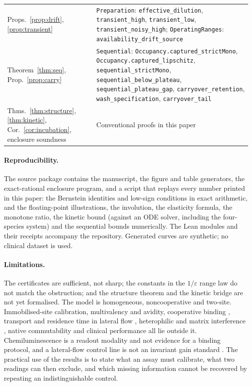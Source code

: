 \documentclass[11pt]{article}
\theoremstyle{plain}
\theoremstyle{definition}
\numberwithin{equation}{section}
\newcommand{\eps}{\varepsilon}
\begin{document}
\begin{table}[t]
\begin{tabular}{@{}>{\raggedright\arraybackslash}p{.33\linewidth}>{\raggedright\arraybackslash}p{.62\linewidth}@{}}
Props.~\ref{prop:drift}, \ref{prop:transient} & \texttt{Preparation}: \texttt{effective\_dilution}, \texttt{transient\_high}, \texttt{transient\_low}, \texttt{transient\_noisy\_high}; \texttt{OperatingRanges}: \texttt{availability\_drift\_source}\\
Theorem~\ref{thm:seq}, Prop.~\ref{prop:carry} & \texttt{Sequential}: \texttt{Occupancy.captured\_strictMono}, \texttt{Occupancy.captured\_lipschitz}, \texttt{sequential\_strictMono}, \texttt{sequential\_below\_plateau}, \texttt{sequential\_plateau\_gap}, \texttt{carryover\_retention}, \texttt{wash\_specification}, \texttt{carryover\_tail}\\
Thms.~\ref{thm:structure}, \ref{thm:kinetic}, Cor.~\ref{cor:incubation}, enclosure soundness & Conventional proofs in this paper\\\bottomrule
\end{tabular}
\end{table}

\paragraph{Reproducibility.} The source package contains the manuscript, the figure
and table generators, the exact-rational enclosure program, and a script that
replays every number printed in this paper: the Bernstein identities and low-sign
conditions in exact arithmetic, and the floating-point illustrations, the
involution, the elasticity formula, the monotone ratio, the kinetic bound (against
an ODE solver, including the four-species system) and the sequential bounds
numerically. The Lean modules and their receipts accompany the repository.
Generated curves are synthetic; no clinical dataset is used.

\paragraph{Limitations.} The certificates are sufficient, not sharp; the constants
in the $1/\eps$ range law do not match the obstruction; and the structure theorem
and the kinetic bridge are not yet formalised. The model is homogeneous,
noncooperative and two-site. Immobilised-site calibration, multivalency and avidity,
cooperative binding \cite{roy2017}, transport and residence time in lateral flow
\cite{qian2003,ross2020}, heterophilic and matrix interference
\cite{selby1999,tate2004,sturgeon2011}, native commutability and clinical
performance all lie outside it. Chemiluminescence is a readout modality and not
evidence for a binding protocol, and a lateral-flow control line is not an invariant
gain standard \cite{ross2020}. The practical use of the results is to state what an
assay must calibrate, what two readings can then exclude, and which missing
information cannot be recovered by repeating an indistinguishable control.
\end{document}
